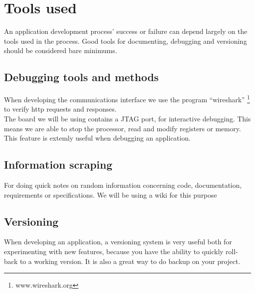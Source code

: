 \section{Tools used}
An application development process' success or failure can depend largely on the tools used in the process. Good tools for documenting, debugging and versioning should be considered bare minimums.
\subsection{Debugging tools and methods}
When developing the communications interface we use the program ``wireshark'' \footnote{www.wireshark.org} to verify http requests and responses.\\
The board we will be using contains a JTAG port, for interactive debugging. This means we are able to stop the processor, read and modify registers or memory. This feature is extemly useful when debugging an application.

\subsection{Information scraping}
For doing quick notes on random information concerning code, documentation, requirements or specifications. We will be using a wiki for this purpose

\subsection{Versioning}
When developing an application, a versioning system is very useful both for experimenting with new features, because you have the ability to quickly roll-back to a working version. It is also a great way to do backup on your project.




